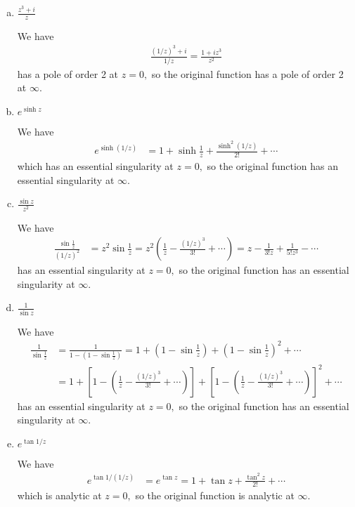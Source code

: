 \documentclass{article}
\begin{document}
\begin{itemize}
\begin{enumerate}[(a)]
			\item $\frac{z^3+i}{z}$
				\begin{soln}
					We have
					\begin{align*}
						\frac{(1/z)^3+i}{1/z} = \frac{1+iz^3}{z^2}
					\end{align*}
					has a pole of order 2 at $z=0,$ so the original function has a pole of order 2 at $\infty.$
				\end{soln}

			\item $e^{\sinh z}$
				\begin{soln}
					We have
					\begin{align*}
						e^{\sinh (1/z)} &= 1+\sinh\frac{1}{z} + \frac{\sinh^2 (1/z)}{2!} + \cdots 
					\end{align*}
					which has an essential singularity at $z=0,$ so the original function has an essential singularity at $\infty.$
				\end{soln}

			\item $\frac{\sin z}{z^2}$
				\begin{soln}
					We have
					\begin{align*}
						\frac{\sin \frac{1}{z}}{(1/z)^2} &= z^2\sin \frac{1}{z} = z^2\left( \frac{1}{z} - \frac{(1/z)^3}{3!} + \cdots \right) = z - \frac{1}{3!z} + \frac{1}{5!z^3} - \cdots
					\end{align*}
					has an essential singularity at $z=0,$ so the original function has an essential singularity at $\infty.$
				\end{soln}

			\item $\frac{1}{\sin z}$
				\begin{soln}
					We have
					\begin{align*}
						\frac{1}{\sin \frac{1}{z}} &= \frac{1}{1-\left( 1-\sin \frac{1}{z} \right)} = 1 + \left( 1-\sin \frac{1}{z} \right) + \left( 1-\sin\frac{1}{z} \right)^2 + \cdots \\
						&= 1 + \left[ 1-\left( \frac{1}{z} - \frac{(1/z)^3}{3!} + \cdots \right) \right] + \left[ 1-\left( \frac{1}{z} - \frac{(1/z)^3}{3!} + \cdots \right) \right]^2 + \cdots
					\end{align*}
					has an essential singularity at $z=0,$ so the original function has an essential singularity at $\infty.$
				\end{soln}

			\item $e^{\tan 1/z}$
				\begin{soln}
					We have
					\begin{align*}
						e^{\tan 1/(1/z)} &= e^{\tan z} = 1 + \tan z + \frac{\tan^2z}{2!} + \cdots 
					\end{align*}
					which is analytic at $z=0,$ so the original function is analytic at $\infty.$
				\end{soln}
				

\end{enumerate}
\end{itemize}
\end{document}
